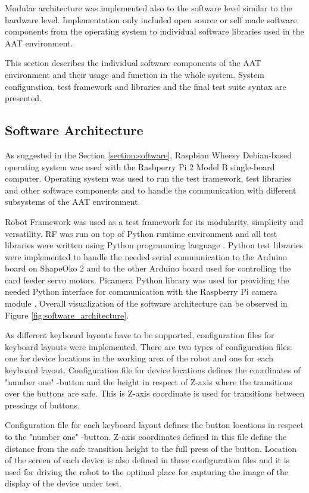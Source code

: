 Modular architecture was implemented also to the software level similar to the hardware level. Implementation only included open source or self made software components from the operating system to individual software libraries used in the AAT environment.

This section describes the individual software components of the AAT environment and their usage and function in the whole system. System configuration, test framework and libraries and the final test suite syntax are presented.

\subsection{Software Architecture}
\label{subsection:Software architecture}

As suggested in the Section \ref{section:software}, Raspbian Wheesy Debian-based operating system was used with the Rasbperry Pi 2 Model B single-board computer. Operating system was used to run the test framework, test libraries and other software components and to handle the communication with different subsystems of the AAT environment.

Robot Framework was used as a test framework for its modularity, simplicity and versatility. RF was run on top of Python runtime environment and all test libraries were written using Python programming language \emph{\citep{python}}. Python test libraries were implemented to handle the needed serial communication to the Arduino board on ShapeOko 2 and to the other Arduino board used for controlling the card feeder servo motors. Picamera Python library was used for providing the needed Python interface for communication with the Raspberry Pi camera module \emph{\citep{picamera}}. Overall visualization of the software architecture can be observed in Figure \ref{fig:software_architecture}.

As different keyboard layouts have to be supported, configuration files for keyboard layouts were implemented. There are two types of configuration files: one for device locations in the working area of the robot and one for each keyboard layout. Configuration file for device locations defines the coordinates of "number one" -button and the height in respect of Z-axis where the transitions over the buttons are safe. This is Z-axis coordinate is used for transitions between pressings of buttons. 

Configuration file for each keyboard layout defines the button locations in respect to the "number one" -button. Z-axis coordinates defined in this file define the distance from the safe transition height to the full press of the button. Location of the screen of each device is also defined in these configuration files and it is used for driving the robot to the optimal place for capturing the image of the display of the device under test. 

